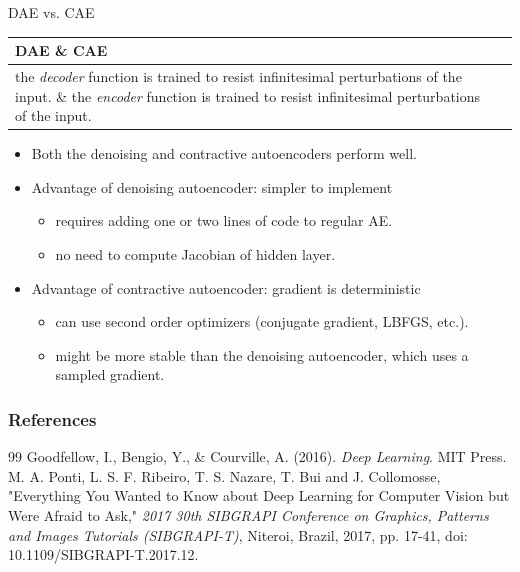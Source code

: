 \documentclass[11pt,compress,t,notes=noshow, xcolor=table]{beamer}
\begin{document}
\begin{frame}[t]{DAE vs. CAE}
    \begin{table}[h!]
        \centering
        \label{tab:}
        \begin{tabular}{p{5cm}|p{5cm}}
            \textbf{DAE} \& \textbf{CAE}\\
            \hline
            the \textit{decoder} function is trained to resist infinitesimal perturbations of the input. \& the \textit{encoder} function is trained to resist infinitesimal perturbations of the input.
        \end{tabular}
    \end{table}

\begin{itemize}
\item Both the denoising and contractive autoencoders perform well.
\item Advantage of denoising autoencoder: simpler to implement
\begin{itemize}
\item  requires adding one or two lines of code to regular AE.
\item  no need to compute Jacobian of hidden layer.
\end{itemize}
\item Advantage of contractive autoencoder: gradient is deterministic
\begin{itemize}
\item can use second order optimizers (conjugate gradient, LBFGS, etc.).
\item might be more stable than the denoising autoencoder, which uses a sampled gradient.
\end{itemize}

\end{itemize}

\end{frame}


\begin{vbframe}
\frametitle{References}
\footnotesize{
\begin{thebibliography}{99}
Goodfellow, I., Bengio, Y., \& Courville, A. (2016). \textit{Deep Learning}. MIT Press.
 M. A. Ponti, L. S. F. Ribeiro, T. S. Nazare, T. Bui and J. Collomosse, "Everything You Wanted to Know about Deep Learning for Computer Vision but Were Afraid to Ask," \textit{2017 30th SIBGRAPI Conference on Graphics, Patterns and Images Tutorials (SIBGRAPI-T)}, Niteroi, Brazil, 2017, pp. 17-41, doi: 10.1109/SIBGRAPI-T.2017.12.

\end{thebibliography}
}
\end{vbframe}


\endlecture
\end{document}
